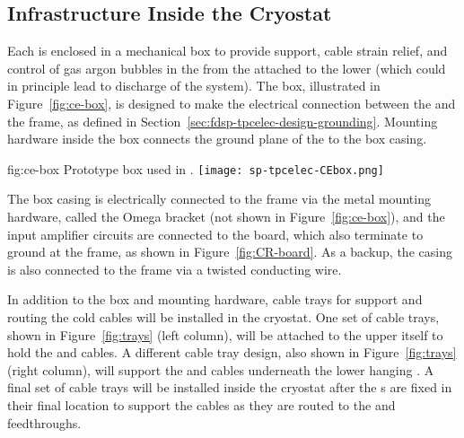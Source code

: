 \subsection{Infrastructure Inside the Cryostat}
\label{sec:fdsp-tpcelec-design-infrastructure}

Each  is enclosed in a mechanical  box to provide support, cable strain
relief, and control of gas argon bubbles in the  from the  attached to the lower 
(which could in principle lead to discharge of the  system).
The  box, illustrated in Figure~\ref{fig:ce-box}, is designed to make the electrical connection 
between the  and the  frame, as defined in Section~\ref{sec:fdsp-tpcelec-design-grounding}.
Mounting hardware inside the  box connects the ground plane of the  to the box casing.

\begin{dunefigure}
{fig:ce-box}
{Prototype  box used in .}
\texttt{[image: sp-tpcelec-CEbox.png]}
\end{dunefigure}

The  box casing is electrically connected to the  frame via the metal mounting hardware,
called the Omega bracket (not shown in Figure~\ref{fig:ce-box}), 
and the input amplifier circuits are connected to the  board, which also terminate to
ground at the  frame, as shown in Figure~\ref{fig:CR-board}.
As a backup, the casing is also connected to the  frame via a twisted conducting wire.

In addition to the  box and mounting hardware, cable trays for support and routing the cold cables will be installed in the 
cryostat. One set of cable trays, shown in Figure~\ref{fig:trays} (left column), will be attached to the upper  itself 
to hold the  and  cables. A different cable tray design, also shown in Figure~\ref{fig:trays} (right column), will support the  and  cables underneath the lower hanging . A final set of cable trays will be installed inside the 
cryostat after the s are fixed in their final location to support the cables as they are 
routed to the  and  feedthroughs.

